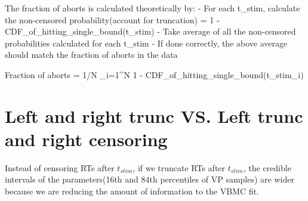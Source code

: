 The fraction of aborts is calculated theoretically by:
- For each t_stim, calculate the non-censored probability(account for truncation) = 1 - CDF_of_hitting_single_bound(t_stim)
- Take average of all the non-censored probabilities calculated for each t_stim
- If done correctly, the above average should match the fraction of aborts in the data

Fraction of aborts = 1/N \Sigma_{i=1}^{N} 1 - CDF_of_hitting_single_bound(t_stim_i)   




\section{Left and right trunc VS. Left trunc and right censoring}
Instead of censoring RTs after $t_{stim}$, if we truncate RTs after $t_{stim}$, 
the credible intervals of the parameters(16th and 84th percentiles of VP samples) are wider because we are reducing the amount of 
information to the VBMC fit.

